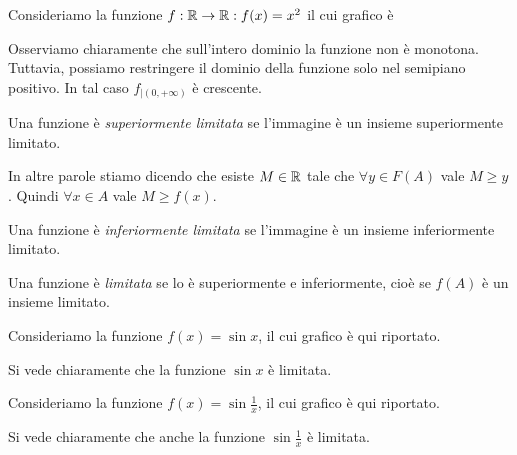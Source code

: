 \begin{example}
Consideriamo la funzione $f: \mathbb R \to \mathbb R : f(x) = x^2$ il cui grafico è
\begin{center}
\end{center}
Osserviamo chiaramente che sull'intero dominio la funzione non è monotona. Tuttavia, possiamo restringere il dominio della funzione solo nel semipiano positivo. In tal caso $f_{|(0,+\infty)}$ è crescente.
\end{example}

\begin{definition}
Una funzione è \emph{superiormente limitata} se l'immagine è un insieme superiormente limitato.
\end{definition}
In altre parole stiamo dicendo che esiste $M \in \mathbb R$ tale che $\forall y \in F(A)$ vale $M \ge y$. Quindi $\forall x \in A$ vale $M \ge f(x)$.

\begin{definition}
Una funzione è \emph{inferiormente limitata} se l'immagine è un insieme inferiormente limitato.
\end{definition}

\begin{definition}
Una funzione è \emph{limitata} se lo è superiormente e inferiormente, cioè se $f(A)$ è un insieme limitato.
\end{definition}

\begin{example}
Consideriamo la funzione $f(x) = \sin x$, il cui grafico è qui riportato.
\begin{center}
\end{center}
Si vede chiaramente che la funzione $\sin x$ è limitata.
\end{example}

\begin{example}
Consideriamo la funzione $f(x) = \sin \frac{1}{x}$, il cui grafico è qui riportato.
\begin{center}
\end{center}
Si vede chiaramente che anche la funzione $\sin \frac{1}{x}$ è limitata.
\end{example}

